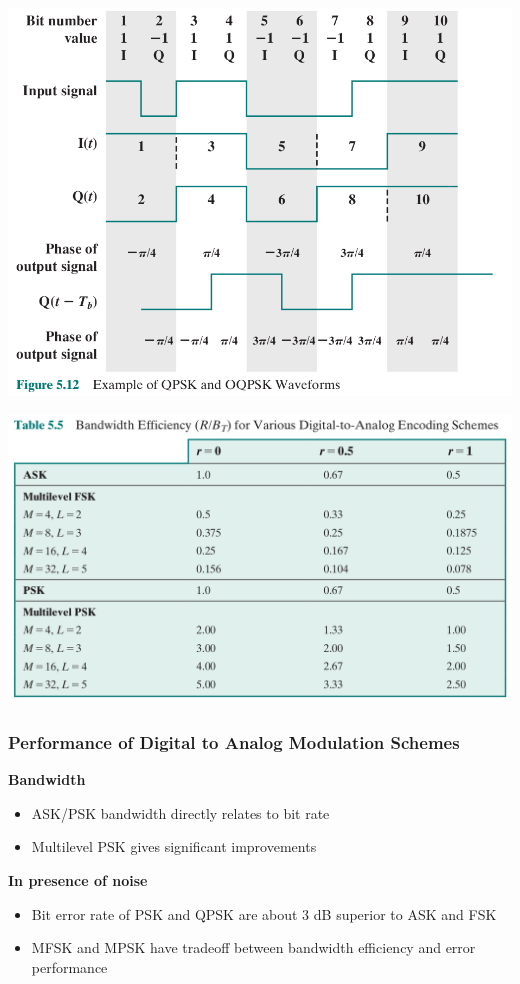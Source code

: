 \documentclass[pdflatex,compress]{beamer}
\begin{document}
\begin{frame}
	\begin{center}
		\includegraphics[width=0.8\linewidth]{img/img17}
	\end{center}
\end{frame}

\begin{frame}
	\begin{center}
		\includegraphics[width=\linewidth]{img/img18}
	\end{center}
\end{frame}

\begin{frame}
	\frametitle{Performance of Digital to Analog Modulation Schemes}
	\begin{multicols}{2}
		\centering \textbf{Bandwidth}
		\begin{itemize}
			\item ASK/PSK bandwidth directly relates to bit rate
			\item Multilevel PSK gives significant improvements
		\end{itemize}
		\vfill\null
		\columnbreak
		\centering \textbf{In presence of noise}
		\begin{itemize}
			\item Bit error rate of PSK and QPSK are about 3 dB superior to ASK and FSK
			\item MFSK and MPSK have tradeoff between bandwidth efficiency and error performance
		\end{itemize}
	\end{multicols}
\end{frame}
\end{document}
